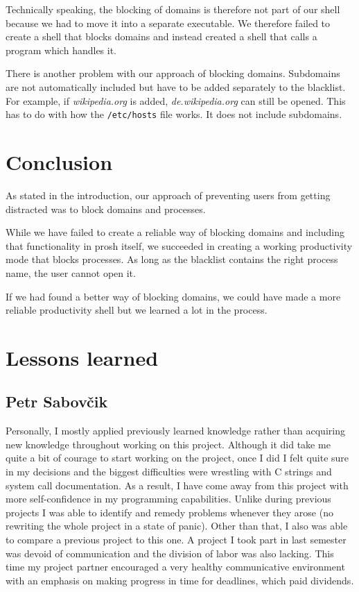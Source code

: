 \documentclass{article}
\begin{document}
Technically speaking, the blocking of domains is therefore not part of our shell because we had to move it into a separate executable. We therefore failed to create a shell that blocks domains and instead created a shell that calls a program which handles it.

There is another problem with our approach of blocking domains. Subdomains are not automatically included but have to be added separately to the blacklist. For example, if \textit{wikipedia.org} is added, \textit{de.wikipedia.org} can still be opened. This has to do with how the \texttt{/etc/hosts} file works. It does not include subdomains.

\section{Conclusion}

As stated in the introduction, our approach of preventing users from getting distracted was to block domains and processes.

While we have failed to create a reliable way of blocking domains and including that functionality in prosh itself, we succeeded in creating a working productivity mode that blocks processes. As long as the blacklist contains the right process name, the user cannot open it.

If we had found a better way of blocking domains, we could have made a more reliable productivity shell but we learned a lot in the process.

\section{Lessons learned}
\subsection{Petr Sabovčik}

Personally, I mostly applied previously learned knowledge rather than acquiring new knowledge throughout working on this project. Although it did take me quite a bit of courage to start working on the project, once I did I felt quite sure in my decisions and the biggest difficulties were wrestling with C strings and system call documentation. As a result, I have come away from this project with more self-confidence in my programming capabilities. Unlike during previous projects I was able to identify and remedy problems whenever they arose (no rewriting the whole project in a state of panic). Other than that, I also was able to compare a previous project to this one. A project I took part in last semester was devoid of communication and the division of labor was also lacking. This time my project partner encouraged a very healthy communicative environment with an emphasis on making progress in time for deadlines, which paid dividends.
\end{document}
